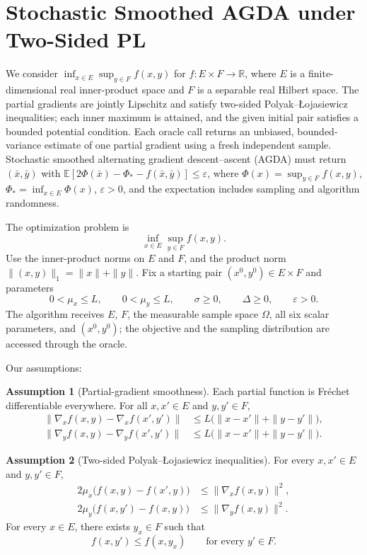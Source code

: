 \documentclass[10pt]{article}
\theoremstyle{definition}
\newtheorem{assumption}{Assumption}
\begin{document}
\section*{Stochastic Smoothed AGDA under Two-Sided PL}
We consider $\inf_{x\in E}\sup_{y\in F}f(x,y)$ for $f:E\times F\to\mathbb{R}$, where $E$ is a finite-dimensional real inner-product space and $F$ is a separable real Hilbert space. The partial gradients are jointly Lipschitz and satisfy two-sided Polyak--\L{}ojasiewicz inequalities; each inner maximum is attained, and the given initial pair satisfies a bounded potential condition. Each oracle call returns an unbiased, bounded-variance estimate of one partial gradient using a fresh independent sample. Stochastic smoothed alternating gradient descent--ascent (AGDA) must return $(\bar{x},\bar{y})$ with $\mathbb{E}[2\Phi(\bar{x})-\Phi_* -f(\bar{x},\bar{y})]\leq\varepsilon$, where $\Phi(x)=\sup_{y\in F}f(x,y)$, $\Phi_*=\inf_{x\in E}\Phi(x)$, $\varepsilon>0$, and the expectation includes sampling and algorithm randomness.

The optimization problem is
\[
\inf_{x\in E}\sup_{y\in F} f(x,y).
\]
Use the inner-product norms on $E$ and $F$, and the product norm $\|(x,y)\|_1=\|x\|+\|y\|$. Fix a starting pair $(x^0,y^0)\in E\times F$ and parameters
\[
0<\mu_x\leq L,\qquad 0<\mu_y\leq L,\qquad
\sigma\geq0,\qquad \Delta\geq0,\qquad \varepsilon>0.
\]
The algorithm receives $E$, $F$, the measurable sample space $\Omega$, all six scalar parameters, and $(x^0,y^0)$; the objective and the sampling distribution are accessed through the oracle.

Our assumptions:
\begin{assumption}[Partial-gradient smoothness]
Each partial function is Fr\'echet differentiable everywhere. For all $x,x'\in E$ and $y,y'\in F$,
\[
\begin{aligned}
\|\nabla_x f(x,y)-\nabla_x f(x',y')\|
&\leq L\bigl(\|x-x'\|+\|y-y'\|\bigr),\\
\|\nabla_y f(x,y)-\nabla_y f(x',y')\|
&\leq L\bigl(\|x-x'\|+\|y-y'\|\bigr).
\end{aligned}
\]
\end{assumption}

\begin{assumption}[Two-sided Polyak--\L{}ojasiewicz inequalities]
For every $x,x'\in E$ and $y,y'\in F$,
\[
\begin{aligned}
2\mu_x\bigl(f(x,y)-f(x',y)\bigr)
&\leq \|\nabla_x f(x,y)\|^2,\\
2\mu_y\bigl(f(x,y')-f(x,y)\bigr)
&\leq \|\nabla_y f(x,y)\|^2.
\end{aligned}
\]
For every $x\in E$, there exists $y_x\in F$ such that
\[
f(x,y')\leq f(x,y_x)\qquad\text{for every }y'\in F.
\]
\end{assumption}
\end{document}
